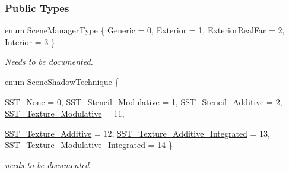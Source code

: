 \subsubsection*{Public Types}
\begin{DoxyCompactItemize}
\item 
enum \hyperlink{classphys_1_1SceneManager_a14fe15dcf41564fdf12f3e11c1a4b774}{SceneManagerType} \{ \hyperlink{classphys_1_1SceneManager_a14fe15dcf41564fdf12f3e11c1a4b774ae556c6d77cbc80f7fddb859d1bde7738}{Generic} =  0, 
\hyperlink{classphys_1_1SceneManager_a14fe15dcf41564fdf12f3e11c1a4b774a76452baaacf89eac4d34596826d19ca7}{Exterior} =  1, 
\hyperlink{classphys_1_1SceneManager_a14fe15dcf41564fdf12f3e11c1a4b774a483ff734e11e4f63eb81569b2ade26e1}{ExteriorRealFar} =  2, 
\hyperlink{classphys_1_1SceneManager_a14fe15dcf41564fdf12f3e11c1a4b774ab582df9aaf3ba748a7dd4c6f5bd7250d}{Interior} =  3
 \}
\begin{DoxyCompactList}\small\item\em Needs to be documented. \item\end{DoxyCompactList}\item 
enum \hyperlink{classphys_1_1SceneManager_a427f1bbb52c11ad07352ae01d8b3c746}{SceneShadowTechnique} \{ \par
\hyperlink{classphys_1_1SceneManager_a427f1bbb52c11ad07352ae01d8b3c746ad96e23ac363ae9de73e2d3816ae66f2e}{SST\_\-None} =  0, 
\hyperlink{classphys_1_1SceneManager_a427f1bbb52c11ad07352ae01d8b3c746a9b11aebab7ffc5ff359f5a49b4ff5e7d}{SST\_\-Stencil\_\-Modulative} =  1, 
\hyperlink{classphys_1_1SceneManager_a427f1bbb52c11ad07352ae01d8b3c746a17ba96aa6b125ac6c787851815370d97}{SST\_\-Stencil\_\-Additive} =  2, 
\hyperlink{classphys_1_1SceneManager_a427f1bbb52c11ad07352ae01d8b3c746a6ce2d2624df59f6c2fb6f3cb07d3adf8}{SST\_\-Texture\_\-Modulative} =  11, 
\par
\hyperlink{classphys_1_1SceneManager_a427f1bbb52c11ad07352ae01d8b3c746af9aba631cfa4181d30d83fa8c2bd71de}{SST\_\-Texture\_\-Additive} =  12, 
\hyperlink{classphys_1_1SceneManager_a427f1bbb52c11ad07352ae01d8b3c746a2cb2c18049fd6f062db3a25e45aa9a16}{SST\_\-Texture\_\-Additive\_\-Integrated} =  13, 
\hyperlink{classphys_1_1SceneManager_a427f1bbb52c11ad07352ae01d8b3c746a85419a12cb66f84865d9c0e50503af8c}{SST\_\-Texture\_\-Modulative\_\-Integrated} =  14
 \}
\begin{DoxyCompactList}\small\item\em needs to be documented \item\end{DoxyCompactList}\item 

\end{DoxyCompactItemize}
